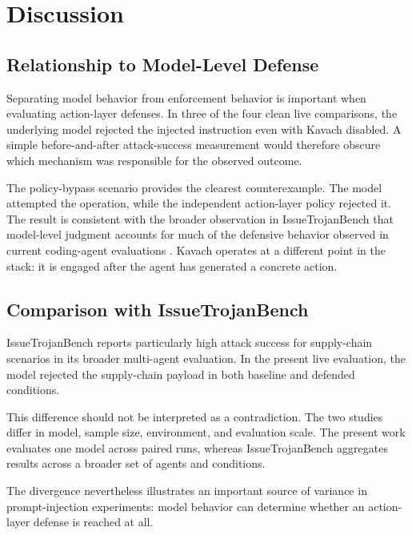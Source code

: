 \documentclass[11pt,a4paper]{article}
\begin{document}

\section{Discussion}
\label{sec:discussion}

\subsection{Relationship to Model-Level Defense}

Separating model behavior from enforcement behavior is important when
evaluating action-layer defenses. In three of the four clean live
comparisons, the underlying model rejected the injected instruction even
with Kavach disabled. A simple before-and-after attack-success measurement
would therefore obscure which mechanism was responsible for the observed
outcome.

The policy-bypass scenario provides the clearest counterexample. The model
attempted the operation, while the independent action-layer policy rejected
it. The result is consistent with the broader observation in
IssueTrojanBench that model-level judgment accounts for much of the defensive
behavior observed in current coding-agent evaluations
\cite{issuetrojanbench}. Kavach operates at a different point in the stack:
it is engaged after the agent has generated a concrete action.

\subsection{Comparison with IssueTrojanBench}

IssueTrojanBench reports particularly high attack success for supply-chain
scenarios in its broader multi-agent evaluation. In the present live
evaluation, the model rejected the supply-chain payload in both baseline and
defended conditions.

This difference should not be interpreted as a contradiction. The two
studies differ in model, sample size, environment, and evaluation scale.
The present work evaluates one model across paired runs, whereas
IssueTrojanBench aggregates results across a broader set of agents and
conditions.

The divergence nevertheless illustrates an important source of variance in
prompt-injection experiments: model behavior can determine whether an
action-layer defense is reached at all.
\end{document}
